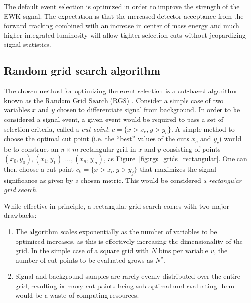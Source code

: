 The default event selection is optimized in order to improve the strength of the \ssww EWK signal.
The expectation is that the increased detector acceptance from the forward tracking combined with an increase in center of mass energy and much higher integrated luminosity will allow tighter selection cuts without jeopardizing signal statistics.

%
\subsection{Random grid search algorithm}\label{sswwupgrade:opt_rgs}
The chosen method for optimizing the event selection is a cut-based algorithm known as the Random Grid Search (RGS) \cite{2018.rgs-paper}.
Consider a simple case of two variables $x$ and $y$ chosen to differentiate signal from background.
In order to be considered a signal event, a given event would be required to pass a set of selection criteria, called a \emph{cut point}: $c = \{x > x_c, y > y_c\}$.
A simple method to choose the optimal cut point (i.e. the ``best'' values of the cuts $x_c$ and $y_c$) would be to construct an $n\times m$ rectangular grid in $x$ and $y$ consisting of points $(x_0,y_0), (x_1,y_1), ..., (x_n,y_m)$, as Figure~\ref{fig:rgs_grids_rectangular}.
One can then choose a cut point $c_k = \{x > x_i, y > y_j\}$ that maximizes the signal significance as given by a chosen metric.
This would be considered a \emph{rectangular grid search}.

While effective in principle, a rectangular grid search comes with two major drawbacks:
\begin{enumerate}
\item The algorithm scales exponentially as the number of variables to be optimized increases, as this is effectively increasing the dimensionality of the grid.  In the simple case of a square grid with $N$ bins per variable $v$, the number of cut points to be evaluated grows as $N^v$.
\item Signal and background samples are rarely evenly distributed over the entire grid, resulting in many cut points being sub-optimal and evaluating them would be a waste of computing resources.
\end{enumerate}

